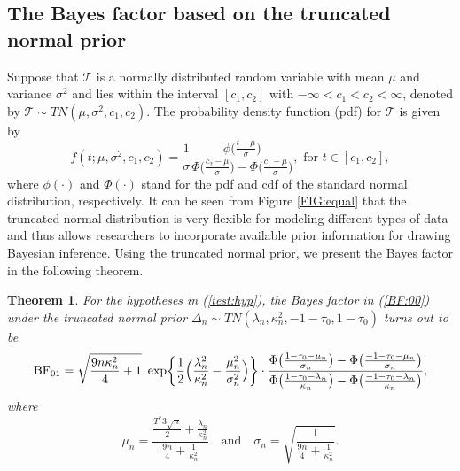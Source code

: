 \documentclass[11pt]{article}
\newtheorem{theorem0}{Theorem}
\begin{document}
\subsection{The Bayes factor based on the truncated normal prior} \label{section:02:02}

Suppose that $\mathcal{T}$ is a normally distributed random variable with mean $\mu$ and variance $\sigma^2$ and lies within the interval $[c_1, c_2]$ with $-\infty < c_1 < c_2 < \infty$, denoted by $\mathcal{T} \sim TN(\mu, \sigma^2, c_1, c_2)$. The probability density function (pdf) for $\mathcal{T}$ is given by
\begin{equation*}
f(t; \mu,\sigma^2, c_1, c_2)=\frac{1}{\sigma}{\frac {\phi \bigl({\frac {t-\mu}{\sigma}}\bigr)}{ \Phi \bigl({\frac {c_2- \mu }{\sigma }}\bigr)-\Phi \bigl({\frac {c_1-\mu }{\sigma }}\bigr)}},\text{ for }t\in[c_1, c_2],
\end{equation*}
where $\phi( \cdot)$ and $\Phi (\cdot)$ stand for the pdf and cdf of the standard normal distribution, respectively. It can be seen from Figure \ref{FIG:equal} that the truncated normal distribution is very flexible for modeling different types of data and thus allows researchers to incorporate available prior information for drawing Bayesian inference. Using the truncated normal prior, we present the Bayes factor in the following theorem.

\begin{theorem0} \label{theorem:01}
For the hypotheses in (\ref{test:hyp}), the Bayes factor in (\ref{BF:00}) under the truncated normal prior $\Delta_n \sim TN(\lambda_n, \kappa_n^2, -1 - \tau_0, 1 - \tau_0)$ turns out to be
\begin{equation} \label{PBF}
\mathrm{BF}_{01} =\sqrt{\frac{9n\kappa_n^2}{4}+1} ~\exp \biggl\{\frac{1}{2}\Bigl(\frac{\lambda_n^2}{\kappa_n^2}- \frac{\mu_n^2 }{\sigma_n^2} \Bigr)  \biggr\}\cdot \frac{\Phi\bigl(\frac{1-\tau_0-\mu_n}{\sigma_n}\bigr)-\Phi\bigl(\frac{-1-\tau_0-\mu_n}{\sigma_n}\bigr)}{\Phi\bigl(\frac{1-\tau_0-\lambda_n}{\kappa_n}\bigr)-\Phi\bigl(\frac{-1-\tau_0-\lambda_n}{\kappa_n}\bigr)},
\end{equation}
where
\begin{equation}\label{eq:postMeanVar}
\mu_n=\frac{\frac{T^\ast 3\sqrt{n}}{2}+ \frac{\lambda_n}{\kappa_n^2}}{\frac{9n}{4} + \frac{1}{\kappa_n^2} }
\quad \mathrm{and} \quad \sigma_n = \sqrt{\frac{1}{\frac{9n}{4} + \frac{1}{\kappa_n^2}}}.
\end{equation}
\end{theorem0}
\end{document}
